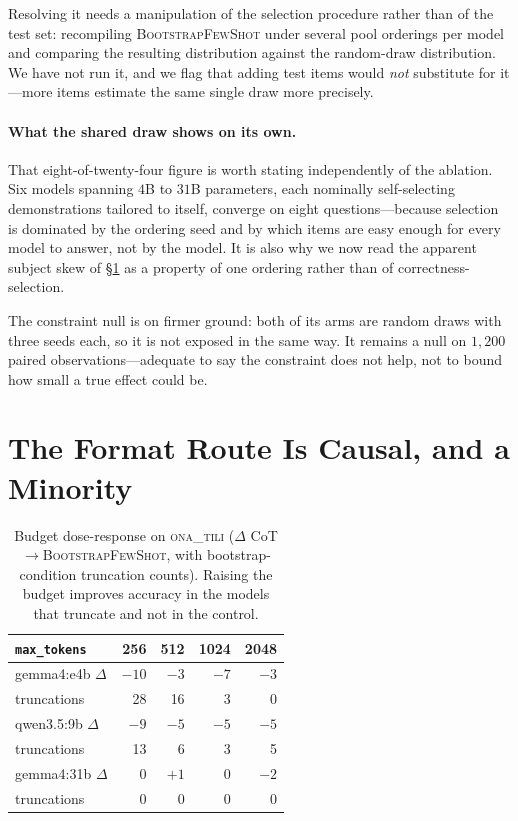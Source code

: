 \documentclass[11pt]{article}
\newcommand{\ona}{\textsc{ona\_tili}}
\newcommand{\bsfs}{\textsc{BootstrapFewShot}}
\begin{document}
Resolving it needs a manipulation of the selection procedure rather than of the test set:
recompiling \bsfs{} under several pool orderings per model and comparing the resulting
distribution against the random-draw distribution. We have not run it, and we flag that
adding test items would \emph{not} substitute for it---more items estimate the same
single draw more precisely.

\paragraph{What the shared draw shows on its own.} That eight-of-twenty-four figure is
worth stating independently of the ablation. Six models spanning $4$B to $31$B parameters,
each nominally self-selecting demonstrations tailored to itself, converge on eight
questions---because selection is dominated by the ordering seed and by which items are
easy enough for every model to answer, not by the model. It is also why we now read the
apparent subject skew of \S\ref{sec:budget} as a property of one ordering rather than of
correctness-selection.

The constraint null is on firmer ground: both of its arms are random draws with three
seeds each, so it is not exposed in the same way. It remains a null on $1{,}200$ paired
observations---adequate to say the constraint does not help, not to bound how small a
true effect could be.

\section{The Format Route Is Causal, and a Minority}\label{sec:budget}

\begin{table}[t]\centering\small
\caption{Budget dose-response on \ona{} ($\Delta$ CoT${\to}$\bsfs{}, with
bootstrap-condition truncation counts). Raising the budget improves accuracy in the
models that truncate and not in the control.}
\label{tab:dose}
\setlength{\tabcolsep}{4.5pt}
\begin{tabular}{lrrrr}
\toprule
\texttt{max\_tokens} & 256 & 512 & 1024 & 2048 \\
\midrule
gemma4:e4b $\Delta$ & $-10$ & $-3$ & $-7$ & $-3$ \\
\quad truncations & 28 & 16 & 3 & 0 \\
qwen3.5:9b $\Delta$ & $-9$ & $-5$ & $-5$ & $-5$ \\
\quad truncations & 13 & 6 & 3 & 5 \\
gemma4:31b $\Delta$ & $0$ & $+1$ & $0$ & $-2$ \\
\quad truncations & 0 & 0 & 0 & 0 \\
\bottomrule
\end{tabular}
\end{table}
\end{document}
